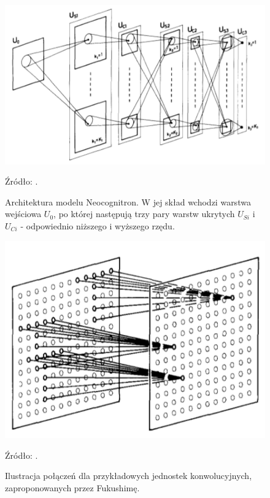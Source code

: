 \documentclass[12pt,a4paper,twoside]{article}
\newcommand{\source}[1]{\caption*{\hfill Źródło: {#1}} }
\begin{document}
\begin{figure}[h]
  \centering
\includegraphics[scale=0.7]{../obrazy/fig:neocognitron.png}
\caption{Architektura modelu Neocognitron. W jej skład wchodzi warstwa wejściowa \(U_0\), po której następują trzy pary warstw ukrytych \(U_{Si} \) i \(U_{Ci} \) - odpowiednio niższego i wyższego rzędu.\label{fig:neocognitron}}
\source{\citet{fukushima1980}.}
\end{figure}

\begin{figure}[h]
  \centering
\includegraphics[scale=0.5]{../obrazy/fig:convolution.png}
\caption{Ilustracja połączeń dla przykładowych jednostek konwolucyjnych, zaproponowanych przez Fukushimę.\label{fig:convolution}}
\source{\citet{fukushima1980}.}
\end{figure}
\end{document}
